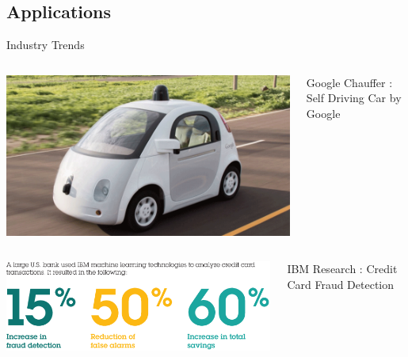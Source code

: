 \documentclass[10pt]{beamer}
\begin{document}
		\subsection{Applications}
			\begin{frame}{Industry Trends}
				\begin{columns}
					\begin{column}{0.5\textwidth}
						\begin{center}
						\includegraphics[width=0.9\linewidth]{images/app-2}
						\end{center}
					\end{column}
					\begin{column}{0.5\textwidth}
						\begin{center}
							Google Chauffer :
						Self Driving Car by Google
						\end{center}
					\end{column}
				\end{columns}
				\begin{columns}
					\begin{column}{0.5\textwidth}
						\begin{center}
							\includegraphics[width=0.9\linewidth]{images/app-3}
						\end{center}
					\end{column}
					\begin{column}{0.5\textwidth}
						\begin{center}
							IBM Research : Credit Card Fraud Detection

\end{center}
\end{column}
\end{columns}
\end{frame}
\end{document}
